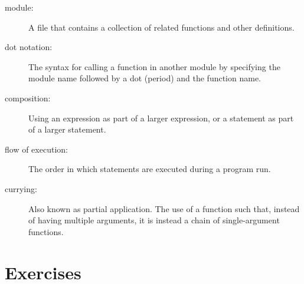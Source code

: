 \documentclass[10pt]{book}
\begin{document}
\begin{description}
\item[module:] A file that contains a
collection of related functions and other definitions.



\item[dot notation:]  The syntax for calling a function in another
module by specifying the module name followed by a dot (period) and
the function name.

\item[composition:] Using an expression as part of a larger expression,
or a statement as part of a larger statement.

\item[flow of execution:]  The order in which statements are executed during
a program run.




\item[currying:] Also known as partial application. The use of a function
such that, instead of having multiple arguments, it is instead a chain of 
single-argument functions.

\end{description}


\section{Exercises}
\end{document}
